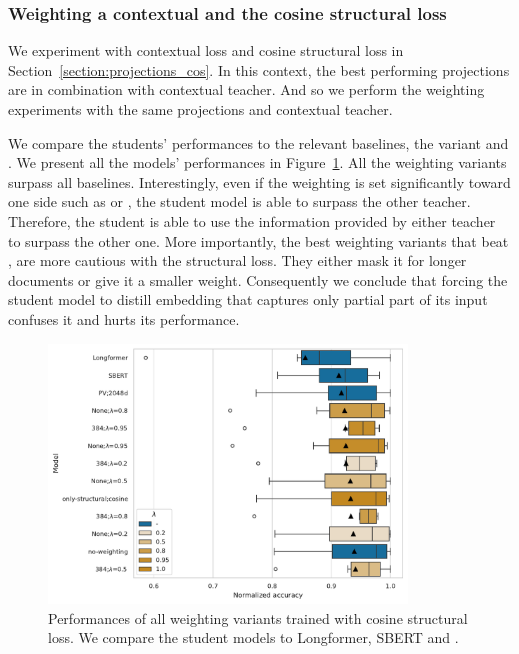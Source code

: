 \subsubsection{Weighting a contextual and the cosine structural loss}

We experiment with contextual loss and cosine structural loss in
Section~\ref{section:projections_cos}. In this context, the best performing
projections are  in combination with
 contextual teacher. And so we perform the weighting
experiments with the same projections and contextual teacher.

We compare the students' performances to the relevant baselines, the
 variant and . We present
all the models' performances in Figure~\ref{fig:cos_weighting}. All the
weighting variants surpass all baselines. Interestingly, even if the weighting
is set significantly toward one side such as  or
, the student model is able to surpass the other
teacher. Therefore, the student is able to use the information provided by
either teacher to surpass the other one. More importantly, the best weighting
variants that beat , are more cautious with the
structural loss. They either mask it for longer documents or give it a smaller
weight. Consequently we conclude that forcing the student model to distill
embedding that captures only partial part of its input confuses it and hurts
its performance.

\begin{figure}
  \centering
  \includegraphics[width=0.85\textwidth]{img/cos_weighting.pdf}

  \caption{Performances of all weighting variants trained with cosine
  structural loss. We compare the student models to Longformer, SBERT and
  .}

  \label{fig:cos_weighting}

\end{figure}

